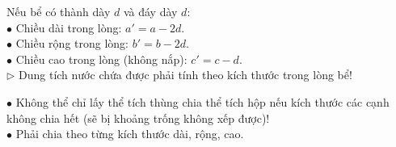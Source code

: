 \documentclass[14pt,a4paper,oneside]{extbook}
\begin{document}
\vspace{3mm}

\noindent
\begin{minipage}[t]{0.54\textwidth}
  \begin{tcolorbox}[
    enhanced,
    title={\footnotesize\bfseries\color{white}\faShield\ Bể có độ dày của thành và đáy},
    colback=green!3!white,
    colframe=green!60!black,
    arc=2.5mm, boxrule=0.8pt, top=1.8mm, bottom=1.8mm, left=2.2mm, right=2.2mm
  ]
    \footnotesize
    Nếu bể có thành dày $d$ và đáy dày $d$:\\
    $\bullet$ Chiều dài trong lòng: $a' = a - 2d$.\\
    $\bullet$ Chiều rộng trong lòng: $b' = b - 2d$.\\
    $\bullet$ Chiều cao trong lòng (không nắp): $c' = c - d$.\\
    $\triangleright$ Dung tích nước chứa được phải tính theo kích thước trong lòng bể!
  \end{tcolorbox}
\end{minipage}%
\hfill
\begin{minipage}[t]{0.44\textwidth}
  \begin{tcolorbox}[
    enhanced,
    title={\footnotesize\bfseries\color{white}\faExclamationTriangle\ Mẹo tránh bẫy trắc nghiệm},
    colback=red!2!white,
    colframe=red!70!black,
    arc=2.5mm, boxrule=0.8pt, top=1.8mm, bottom=1.8mm, left=2.2mm, right=2.2mm
  ]
    \footnotesize
    $\bullet$ Không thể chỉ lấy thể tích thùng chia thể tích hộp nếu kích thước các cạnh không chia hết (sẽ bị khoảng trống không xếp được)!\\
    $\bullet$ Phải chia theo từng kích thước dài, rộng, cao.
  \end{tcolorbox}
\end{minipage}
\end{document}
